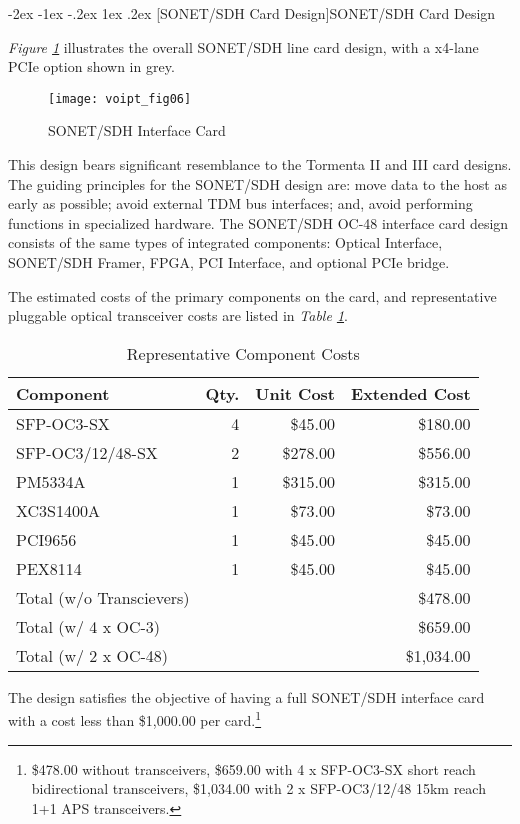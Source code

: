 \documentclass[letterpaper,final,notitlepage,twocolumn,10pt,twoside]{article}
\makeatletter
\let\large = \normalsize
\let\normalsize = \small
\let\small = \footnotesize
\let\footnotesize = \scriptsize
\let\scriptsize = \tiny
\renewcommand\section{\@startsection {section}{1}{\z@}%
                                   {-2ex \@plus -1ex \@minus -.2ex}%
                                   {1ex \@plus .2ex}%
                                   {\normalfont\large\bfseries}}
\makeatother
\begin{document}
\section[SONET/SDH Card Design]{SONET/SDH Card Design}

\textsl{Figure \ref{figure:voipt_fig06}} illustrates the overall SONET/SDH line
card design, with a x4-lane PCIe option shown in grey.
\begin{figure}[htp]
\center\texttt{[image: voipt\_fig06]}
\caption[OC48card]{SONET/SDH Interface Card}
\label{figure:voipt_fig06}
\end{figure}
This design bears significant resemblance to the Tormenta II and III card
designs.  The guiding principles for the SONET/SDH design are: move data to the
host as early as possible; avoid external TDM bus interfaces; and, avoid
performing functions in specialized hardware.  The SONET/SDH OC-48 interface
card design consists of the same types of integrated components: Optical
Interface, SONET/SDH Framer, FPGA, PCI Interface, and optional PCIe bridge.

The estimated costs of the primary components on the card, and representative
pluggable optical transceiver costs are listed in \textsl{Table
\ref{table:components}}.
\begin{table}[htp]
\footnotesize
\begin{center}
\setlength{\tabcolsep}{0.3em}
\setlength{\arraycolsep}{0.3em}
\begin{tabular}{lrrr}\\
Component & Qty. & Unit Cost & Extended Cost\\
\hline
SFP-OC3-SX & 4 & \$45.00 & \$180.00\\
SFP-OC3/12/48-SX & 2 & \$278.00 & \$556.00\\
\hline
PM5334A & 1 & \$315.00 & \$315.00\\
XC3S1400A & 1 & \$73.00 & \$73.00\\
PCI9656 & 1 & \$45.00 & \$45.00\\
PEX8114 & 1 & \$45.00 & \$45.00\\
\hline
Total (w/o Transcievers) & & & \$478.00\\
Total (w/ 4 x OC-3) & & & \$659.00\\
Total (w/ 2 x OC-48) & & & \$1,034.00\\
\hline
\end{tabular}
\caption{Representative Component Costs}
\label{table:components}
\end{center}
\normalsize
\end{table}
The design satisfies the objective of having a full SONET/SDH interface card
with a cost less than \$1,000.00 per card.\footnote{\$478.00 without
transceivers, \$659.00 with 4 x SFP-OC3-SX short reach bidirectional
transceivers, \$1,034.00 with 2 x SFP-OC3/12/48 15km reach 1+1 APS
transceivers.}
\end{document}

